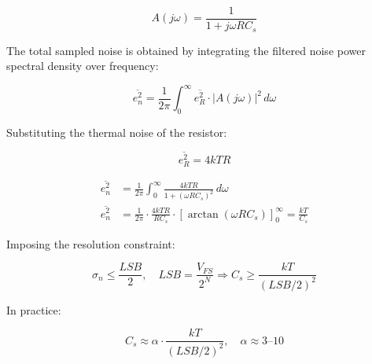 \documentclass[11pt,a4paper]{article}
\begin{document}
\begin{equation}
A(j\omega) = \frac{1}{1 + j\omega R C_s}
\end{equation}

The total sampled noise is obtained by integrating the filtered noise power spectral density over frequency:

\begin{equation}
\overline{e_n^2} = \frac{1}{2\pi} \int_{0}^{\infty} \overline{e_R^2} \cdot |A(j\omega)|^2 \, d\omega
\end{equation}

Substituting the thermal noise of the resistor:

\begin{equation}
\overline{e_R^2} = 4kTR
\end{equation}

\begin{align}
  \overline{e_n^2} &= \frac{1}{2\pi} \int_{0}^{\infty} \frac{4kTR}{1 + (\omega R C_s)^2} \, d\omega \\
\overline{e_n^2} &= \frac{1}{2\pi} \cdot \frac{4kTR}{R C_s} \cdot \left[ \arctan(\omega R C_s) \right]_{0}^{\infty} = \frac{kT}{C_s}
\end{align}

Imposing the resolution constraint:

\begin{equation}
\sigma_n \le \frac{LSB}{2}, \quad LSB = \frac{V_{FS}}{2^N} \Rightarrow C_s \ge \frac{kT}{(LSB/2)^2}
\end{equation}

In practice:

\begin{equation}
C_s \approx \alpha \cdot \frac{kT}{(LSB/2)^2}, \quad \alpha \approx 3\text{--}10
\end{equation}
\end{document}
